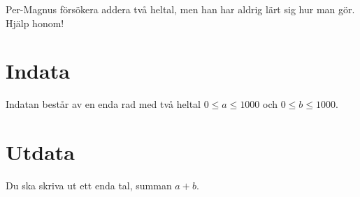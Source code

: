
Per-Magnus försökera addera två heltal, men han har aldrig lärt sig hur man gör. Hjälp honom!

\section*{Indata}

Indatan består av en enda rad med två heltal $0 \le a \le 1000$ och $0 \le b \le 1000$.

\section*{Utdata}

Du ska skriva ut ett enda tal, summan $a + b$.

